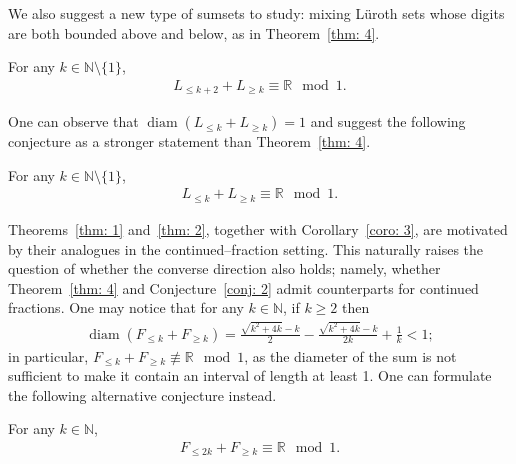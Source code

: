 \documentclass{ws-ijnt}
\begin{document}
	We also suggest a new type of sumsets to study: mixing L\"uroth sets whose digits are both bounded above and below, as in Theorem~\ref{thm: 4}.
	\begin{theorem}\label{thm: 4}
		For any $k\in\mathbb{N}\setminus\{1\}$, 
		\begin{align*}
			L_{\leq  k+2}+L_{\geq k}\equiv\mathbb{R}\mod 1.
		\end{align*}
	\end{theorem}
	One can observe that $\operatorname{diam}{(L_{\leq k}+L_{\geq k})}=1$ and suggest the following conjecture as a stronger statement than Theorem~\ref{thm: 4}.
	\begin{conjecture}\label{conj: 2}
		For any $k\in\mathbb{N}\setminus\{1\}$, 
		\begin{align*}
			L_{\leq k}+L_{\geq k}\equiv\mathbb{R}\mod 1.
		\end{align*}
	\end{conjecture}
	Theorems~\ref{thm: 1} and~\ref{thm: 2}, together with Corollary~\ref{coro: 3}, are motivated by their analogues in the continued–fraction setting. This naturally raises the question of whether the converse direction also holds; namely, whether Theorem~\ref{thm: 4} and Conjecture~\ref{conj: 2} admit counterparts for continued fractions. One may notice that for any $k\in\mathbb{N}$, if $k\geq2$ then
	\begin{align*}
		\operatorname{diam}{\left(F_{\leq k}+F_{\geq k}\right)}
		=\frac{\sqrt{k^{2}+4k}-k}{2}-\frac{\sqrt{k^{2}+4k}-k}{2k}+\frac{1}{k}<1;
	\end{align*}
	in particular, $F_{\leq k}+F_{\geq k}\not\equiv\mathbb{R}\mod1$, as the diameter of the sum is not sufficient to make it contain an interval of length at least 1. One can formulate the following alternative conjecture instead.
	\begin{conjecture}\label{conj: CF upper and lower}
		For any $k\in\mathbb{N}$, 
		\begin{align*}
			F_{\leq2k}+F_{\geq k}\equiv\mathbb{R}\mod 1.
		\end{align*}
	\end{conjecture}
	
\end{document}
